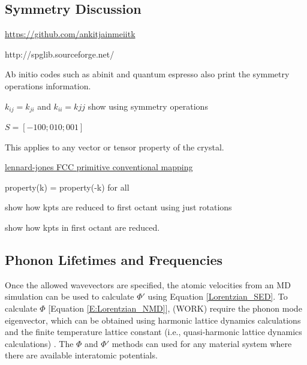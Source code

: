 \subsection{Symmetry Discussion}

\href{https://github.com/ankitjainmeiitk}
{https://github.com/ankitjainmeiitk}

http://spglib.sourceforge.net/

Ab initio codes such as abinit and quantum espresso also print the 
symmetry operations information.

$k_{ij} = k_{ji}$  and $k_{ii} = k{jj}$ show using symmetry operations

$S = [-100;010;001 ]$


This applies to any vector or tensor property of the crystal.
      
\cite{sinha_scattering_2005}

\href{https://github.com/jasonlarkin/disorder/blob/master/matlab/lj/phonon/LJ_PRIM_CONV_MAPPING.m}
{lennard-jones FCC primitive conventional mapping}

property(k) = property(-k)  for all

show how kpts are reduced to first octant using just rotations

show how kpts in first octant are reduced.

\subsection{\label{Subsection_Comp_Details_2}Phonon Lifetimes and 
Frequencies}
Once the allowed wavevectors are specified, the atomic velocities from 
an MD simulation can 
be used to calculate $\Phi'$ using Equation \eqref{Lorentzian_SED}. To 
calculate $\Phi$ 
[Equation \eqref{E:Lorentzian_NMD}], (WORK) 
require the phonon mode eigenvector, which can be obtained using harmonic 
lattice dynamics calculations 
and the finite temperature lattice constant (i.e., quasi-harmonic lattice 
dynamics calculations) 
\cite{dove_introduction_1993}. The $\Phi$ and $\Phi'$ methods can used 
for any material system where there are 
available interatomic potentials.

